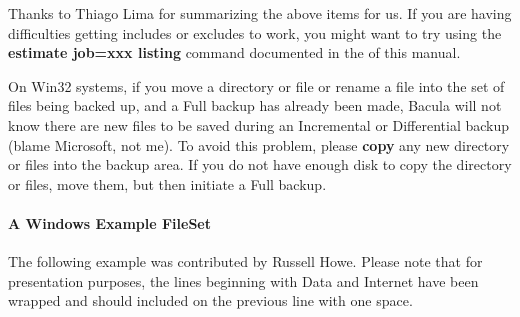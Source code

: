 Thanks to Thiago Lima for summarizing the above items for us. If you are
having difficulties getting includes or excludes to work, you might want to
try using the {\bf estimate job=xxx listing} command documented in the 
 of this manual. 

On Win32 systems, if you move a directory or file or rename a file into the
set of files being backed up, and a Full backup has already been made, Bacula
will not know there are new files to be saved during an Incremental or
Differential backup (blame Microsoft, not me). To avoid this problem, please
{\bf copy} any new directory or files into the backup area. If you do not have
enough disk to copy the directory or files, move them, but then initiate a
Full backup. 


\paragraph*{A Windows Example FileSet}

The following example was contributed by Russell Howe. Please note that
for presentation purposes, the lines beginning with Data and Internet 
have been wrapped and should included on the previous line with one
space.

